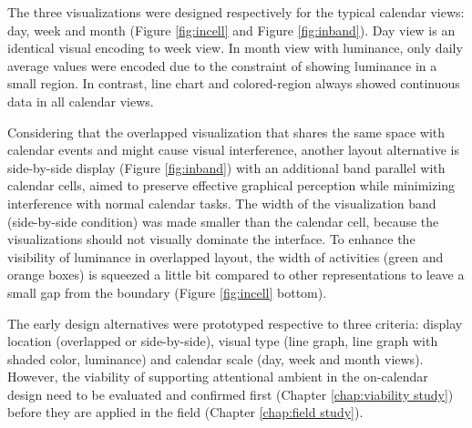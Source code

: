 \documentclass[12pt,oneside]{book}
\begin{document}
The three visualizations were designed respectively for the typical calendar views: day, week and month (Figure \ref{fig:incell} and Figure \ref{fig:inband}).  Day view is an identical visual encoding to week view.  In month view with luminance, only daily average values were encoded due to the constraint of showing luminance in a small region. In contrast, line chart and colored-region always showed continuous data in all calendar views.

Considering that the overlapped visualization that shares the same space with calendar events and might cause visual interference, another layout alternative is side-by-side display (Figure \ref{fig:inband}) with an additional band parallel with calendar cells, aimed to preserve effective graphical perception while minimizing interference with normal calendar tasks. The width of the visualization band (side-by-side condition) was made smaller than the calendar cell, because the visualizations should not visually dominate the interface.  To enhance the visibility of luminance in overlapped layout, the width of activities (green and orange boxes) is squeezed a little bit compared to other representations to leave a small gap from the boundary (Figure \ref{fig:incell} bottom).  

The early design alternatives were prototyped respective to three criteria: display location (overlapped or side-by-side), visual type (line graph, line graph with shaded color, luminance) and calendar scale (day, week and month views).  However, the viability of supporting attentional ambient in the on-calendar design need to be evaluated and confirmed first (Chapter \ref{chap:viability study}) before they are applied in the field (Chapter \ref{chap:field study}).

\end{document}
